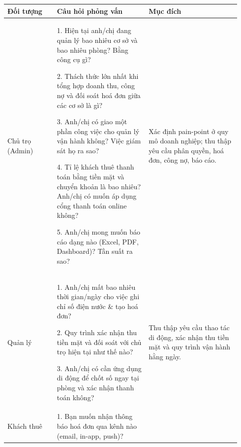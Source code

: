 \begin{longtable}[]{@{}>{\RaggedRight\arraybackslash}p{0.20\linewidth}>{\RaggedRight\arraybackslash}p{0.37\linewidth}>{\RaggedRight\arraybackslash}p{0.37\linewidth}@{}}
\toprule
\textbf{Đối tượng} & \textbf{Câu hỏi phỏng vấn} & \textbf{Mục
đích}\tabularnewline
\midrule
\endhead
\begin{minipage}[t]{\linewidth}\raggedright
Chủ trọ (Admin)\strut
\end{minipage} & \begin{minipage}[t]{\linewidth}\raggedright
1. Hiện tại anh/chị đang quản lý bao nhiêu cơ sở và bao nhiêu phòng?
Bằng công cụ gì?

2. Thách thức lớn nhất khi tổng hợp doanh thu, công nợ và đối soát hoá
đơn giữa các cơ sở là gì?

3. Anh/chị có giao một phần công việc cho quản lý vận hành không? Việc
giám sát họ ra sao?

4. Tỉ lệ khách thuê thanh toán bằng tiền mặt và chuyển khoản là bao
nhiêu? Anh/chị có muốn áp dụng cổng thanh toán online không?

5. Anh/chị mong muốn báo cáo dạng nào (Excel, PDF, Dashboard)? Tần suất
ra sao?\strut
\end{minipage} & \begin{minipage}[t]{\linewidth}\raggedright
Xác định pain-point ở quy mô doanh nghiệp; thu thập yêu cầu phân quyền,
hoá đơn, công nợ, báo cáo.\strut
\end{minipage}\tabularnewline
\begin{minipage}[t]{\linewidth}\raggedright
Quản lý\strut
\end{minipage} & \begin{minipage}[t]{\linewidth}\raggedright
1. Anh/chị mất bao nhiêu thời gian/ngày cho việc ghi chỉ số điện nước \&
tạo hoá đơn?

2. Quy trình xác nhận thu tiền mặt và đối soát với chủ trọ hiện tại như
thế nào?

3. Anh/chị có cần ứng dụng di động để chốt số ngay tại phòng và xác nhận
thanh toán không?\strut
\end{minipage} & \begin{minipage}[t]{\linewidth}\raggedright
Thu thập yêu cầu thao tác di động, xác nhận thu tiền mặt và quy trình
vận hành hằng ngày.\strut
\end{minipage}\tabularnewline
\begin{minipage}[t]{\linewidth}\raggedright
Khách thuê\strut
\end{minipage} & \begin{minipage}[t]{\linewidth}\raggedright
1. Bạn muốn nhận thông báo hoá đơn qua kênh nào (email, in-app, push)?


\end{minipage}
\end{longtable}
